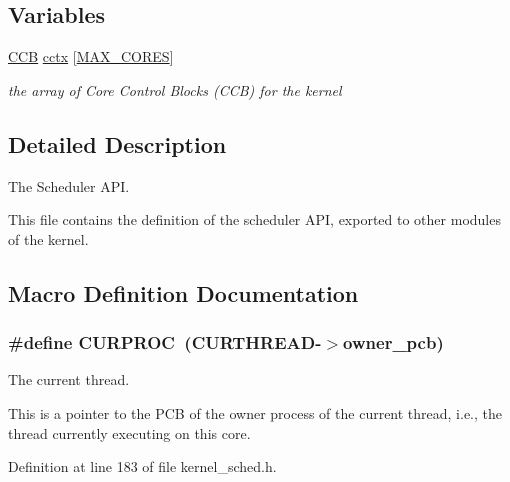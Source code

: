 \subsection*{Variables}
\begin{DoxyCompactItemize}
\item 
\hyperlink{group__scheduler_ga7485b31e0dd9fd723bc2d75fba5206a0}{C\+CB} \hyperlink{group__scheduler_ga3be3b151b275926dff3fb99bee765eab}{cctx} \mbox{[}\hyperlink{bios_8h_a009855593b59738d24dbfc236edb3b14}{M\+A\+X\+\_\+\+C\+O\+R\+ES}\mbox{]}\hypertarget{group__scheduler_ga3be3b151b275926dff3fb99bee765eab}{}\label{group__scheduler_ga3be3b151b275926dff3fb99bee765eab}

\begin{DoxyCompactList}\small\item\em the array of Core Control Blocks (C\+CB) for the kernel \end{DoxyCompactList}\end{DoxyCompactItemize}


\subsection{Detailed Description}
The Scheduler A\+PI. 

This file contains the definition of the scheduler A\+PI, exported to other modules of the kernel. 

\subsection{Macro Definition Documentation}
\subsubsection[{\texorpdfstring{C\+U\+R\+P\+R\+OC}{CURPROC}}]{\setlength{\rightskip}{0pt plus 5cm}\#define C\+U\+R\+P\+R\+OC~({\bf C\+U\+R\+T\+H\+R\+E\+AD}-\/$>$owner\+\_\+pcb)}\hypertarget{group__scheduler_gae3437e8e6787ef05b6576d03c5b6a0ca}{}\label{group__scheduler_gae3437e8e6787ef05b6576d03c5b6a0ca}


The current thread. 

This is a pointer to the P\+CB of the owner process of the current thread, i.\+e., the thread currently executing on this core. 

Definition at line 183 of file kernel\+\_\+sched.\+h.


